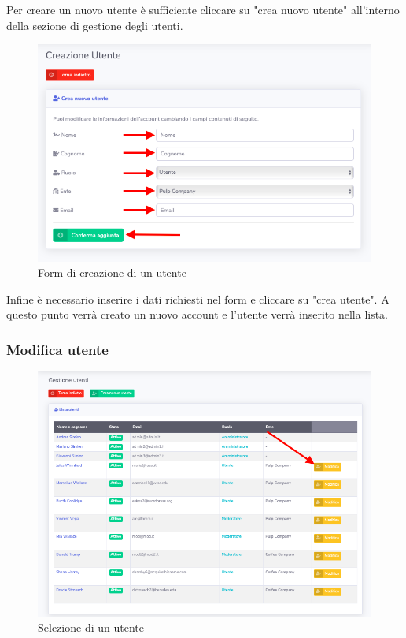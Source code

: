 		Per creare un nuovo utente è sufficiente cliccare su "crea nuovo utente" all'interno della sezione di gestione degli utenti.

		\begin{figure}[H]
		\centering
		\includegraphics[scale=0.600]{res/images/admin/creazUtente.png}
		\caption{Form di creazione di un utente}
	\end{figure}

		Infine è necessario inserire i dati richiesti nel form e cliccare su "crea utente". 
		A questo punto verrà creato un nuovo account e l'utente verrà inserito nella lista.

	\subsubsection{Modifica utente}

		\begin{figure}[H]
		\centering
		\includegraphics[scale=0.600]{res/images/admin/selModUtente.png}
		\caption{Selezione di un utente}
	\end{figure}


